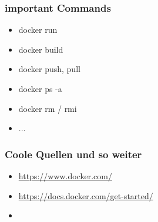 \documentclass[22pt,handout]{beamer}
\begin{document}
\begin{frame}[t]
    \frametitle{important Commands}
    \begin{itemize}
        \item docker run
        \item docker build
        \item docker push, pull
        \item docker ps -a
        \item docker rm / rmi
        \item ...
    \end{itemize} 
\end{frame}

\begin{frame}[t]
    \frametitle{Coole Quellen und so weiter}
    \begin{itemize}
        \item \href{https://www.docker.com/}{https://www.docker.com/}
        \item \href{https://docs.docker.com/get-started/}{https://docs.docker.com/get-started/}
        \item 
    \end{itemize} 
\end{frame}

\end{document}
